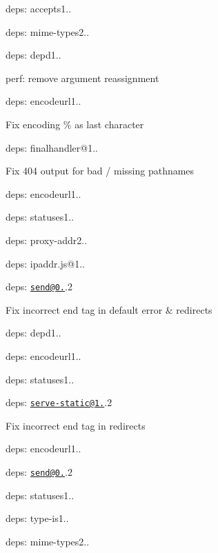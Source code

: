 \begin{DoxyItemize}
\item deps\+: accepts1..
\begin{DoxyItemize}
\item deps\+: mime-\/types2..
\end{DoxyItemize}
\item deps\+: depd1..
\begin{DoxyItemize}
\item perf\+: remove argument reassignment
\end{DoxyItemize}
\item deps\+: encodeurl1..
\begin{DoxyItemize}
\item Fix encoding {\ttfamily \%} as last character
\end{DoxyItemize}
\item deps\+: finalhandler@1..
\begin{DoxyItemize}
\item Fix 404 output for bad / missing pathnames
\item deps\+: encodeurl1..
\item deps\+: statuses1..
\end{DoxyItemize}
\item deps\+: proxy-\/addr2..
\begin{DoxyItemize}
\item deps\+: ipaddr.\+js@1..
\end{DoxyItemize}
\item deps\+: \href{mailto:send@0.16}{\tt send@0.}.2
\begin{DoxyItemize}
\item Fix incorrect end tag in default error \& redirects
\item deps\+: depd1..
\item deps\+: encodeurl1..
\item deps\+: statuses1..
\end{DoxyItemize}
\item deps\+: \href{mailto:serve-static@1.13}{\tt serve-\/static@1.}.2
\begin{DoxyItemize}
\item Fix incorrect end tag in redirects
\item deps\+: encodeurl1..
\item deps\+: \href{mailto:send@0.16}{\tt send@0.}.2
\end{DoxyItemize}
\item deps\+: statuses1..
\item deps\+: type-\/is1..
\begin{DoxyItemize}
\item deps\+: mime-\/types2..
\end{DoxyItemize}
\end{DoxyItemize}

